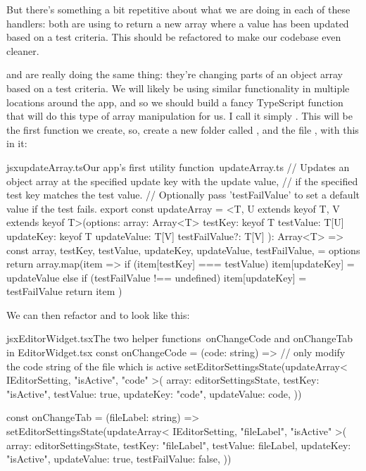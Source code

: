 \documentclass[paper=6in:9in,pagesize=pdftex,headinclude=on,footinclude=on,12pt,twoside]{scrbook}
\begin{document}
But there's something a bit repetitive about what we are doing in each of these handlers: both are using  to return a new array where a value has been updated based on a test criteria. This should be refactored to make our codebase even cleaner.


 and  are really doing the same thing: they're changing parts of an object array based on a test criteria. We will likely be using similar functionality in multiple locations around the app, and so we should build a fancy TypeScript function that will do this type of array manipulation for us. I call it simply . This will be the first  function we create, so, create a new folder called , and the file , with this in it:

\begin{codeInput}{jsx}{updateArray.ts}{Our app's first utility function\, updateArray.ts}
// Updates an object array at the specified update key with the update value,
// if the specified test key matches the test value.
// Optionally pass 'testFailValue' to set a default value if the test fails.
export const updateArray = <T, U extends keyof T, V extends keyof T>(options: {
  array: Array<T>
  testKey: keyof T
  testValue: T[U]
  updateKey: keyof T
  updateValue: T[V]
  testFailValue?: T[V]
}): Array<T> => {
  const {
    array,
    testKey,
    testValue,
    updateKey,
    updateValue,
    testFailValue,
  } = options
  return array.map(item => {
    if (item[testKey] === testValue) {
      item[updateKey] = updateValue
    } else if (testFailValue !== undefined) {
      item[updateKey] = testFailValue
    }
    return item
  })
}
\end{codeInput}

We can then refactor  and  to look like this:

\begin{codeInput}{jsx}{EditorWidget.tsx}{The two helper functions\, onChangeCode and onChangeTab in EditorWidget.tsx}
const onChangeCode = (code: string) => {
  // only modify the code string of the file which is active
  setEditorSettingsState(updateArray<
    IEditorSetting,
    "isActive",
    "code"
  >({
    array: editorSettingsState,
    testKey: "isActive",
    testValue: true,
    updateKey: "code",
    updateValue: code,
  }))
}

const onChangeTab = (fileLabel: string) => {
  setEditorSettingsState(updateArray<
    IEditorSetting,
    "fileLabel",
    "isActive"
  >({
    array: editorSettingsState,
    testKey: "fileLabel",
    testValue: fileLabel,
    updateKey: "isActive",
    updateValue: true,
    testFailValue: false,
  }))
}
\end{codeInput}
\end{document}

